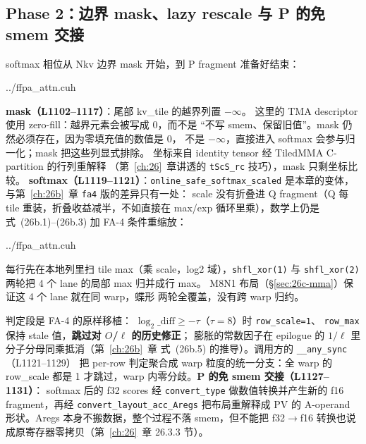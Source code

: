 \subsection{Phase 2：边界 mask、lazy rescale 与 P 的免 smem 交接}\label{sec:26c-rescale}

softmax 相位从 Nkv 边界 mask 开始，到 P fragment 准备好结束：

\begin{lstinputlisting}[linerange={1096-1131},firstnumber=auto,
  title={ffpa\_attn.cuh L1096-1131（Phase 2：mask + online softmax + warp vote + P 免 smem）}]{../ffpa_attn.cuh}
\end{lstinputlisting}

\textbf{mask（L1102--1117）}：尾部 kv\_tile 的越界列置 $-\infty$。
这里的 TMA descriptor 使用 zero-fill：越界元素会被写成 0，而不是
“不写 smem、保留旧值”。mask 仍然必须存在，因为零填充值的数值是 0，
不是 $-\infty$，直接进入 softmax 会参与归一化；mask 把这些列显式排除。
坐标来自 identity tensor 经 TiledMMA C-partition 的行列重解释
（第~\ref{ch:26}~章讲透的 \texttt{tScS\_rc} 技巧），mask 只剩坐标比较。
\textbf{softmax（L1119--1121）}：\texttt{online\_safe\_softmax\_scaled}
是本章的变体，与第~\ref{ch:26b}~章 \texttt{fa4} 版的差异只有一处：
scale 没有折叠进 Q fragment（Q 每 tile 重装，折叠收益减半，不如直接在
max/exp 循环里乘），数学上仍是式~(26b.1)--(26b.3) 加 FA-4 条件重缩放：

\begin{lstinputlisting}[linerange={758-793},firstnumber=auto,
  title={ffpa\_attn.cuh L758-793（\texttt{online\_safe\_softmax\_scaled}：蝶形归约 + 条件重缩放判定）}]{../ffpa_attn.cuh}
\end{lstinputlisting}

每行先在本地列里扫 tile max（乘 scale，log2 域），\texttt{shfl\_xor(1)}
与 \texttt{shfl\_xor(2)} 两轮把 4 个 lane 的局部 max 归并成行 max。
M8N1 布局（\S\ref{sec:26c-mma}）保证这 4 个 lane 就在同 warp，蝶形
两轮全覆盖，没有跨 warp 归约。

判定段是 FA-4 的原样移植：
$\log_2\_\text{diff} \ge -\tau$（$\tau{=}8$）时 \texttt{row\_scale=1}、
\texttt{row\_max} 保持 stale 值，\textbf{跳过对 $O$/$\ell$ 的历史修正}；
膨胀的常数因子在 epilogue 的 $1/\ell$ 里分子分母同乘抵消（第~\ref{ch:26b}~章
式~(26b.5) 的推导）。调用方的 \texttt{\_\_any\_sync}（L1121--1129）
把 per-row 判定聚合成 warp 粒度的统一分支：全 warp 的 row\_scale 都是
1 才跳过，warp 内零分歧。\textbf{P 的免 smem 交接（L1127--1131）}：
softmax 后的 f32 scores 经 \texttt{convert\_type} 做数值转换并产生新的
f16 fragment，再经 \texttt{convert\_layout\_acc\_Aregs} 把布局重解释成
PV 的 A-operand 形状。Aregs 本身不搬数据，整个过程不落 smem，但不能把
f32$\to$f16 转换也说成原寄存器零拷贝（第~\ref{ch:26}~章 26.3.3 节）。

